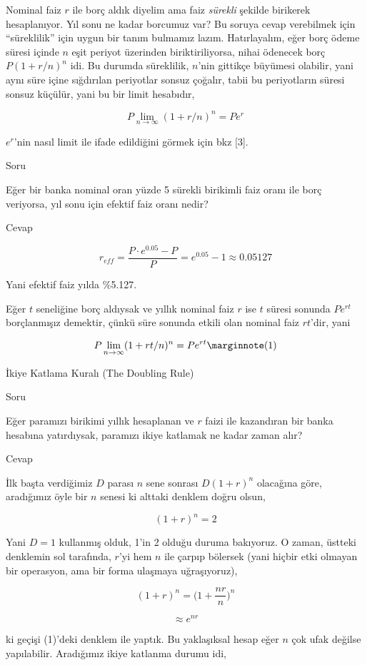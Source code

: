 \documentclass[12pt,fleqn]{article}\usepackage{../../common}
\begin{document}
Nominal faiz $r$ ile borç aldık diyelim ama faiz {\em sürekli} şekilde birikerek
hesaplanıyor. Yıl sonu ne kadar borcumuz var? Bu soruya cevap verebilmek için
``süreklilik'' için uygun bir tanım bulmamız lazım. Hatırlayalım, eğer borç
ödeme süresi içinde $n$ eşit periyot üzerinden biriktiriliyorsa, nihai ödenecek
borç $P(1+r/n)^n$ idi. Bu durumda süreklilik, $n$'nin gittikçe büyümesi
olabilir, yani aynı süre içine sığdırılan periyotlar sonsuz çoğalır, tabii bu
periyotların süresi sonsuz küçülür, yani bu bir limit hesabıdır,

$$ P \lim _{n \to \infty} (1+r/n)^n = Pe^r $$

$e^r$'nin nasıl limit ile ifade edildiğini görmek için bkz [3]. 

Soru

Eğer bir banka nominal oran yüzde 5 sürekli birikimli faiz oranı ile borç
veriyorsa, yıl sonu için efektif faiz oranı nedir?

Cevap

$$ r_{eff} = \frac{P\cdot e^{0.05} - P}{P} = e^{0.05} - 1 \approx 0.05127  $$

Yani efektif faiz yılda \%5.127. 

Eğer $t$ seneliğine borç aldıysak ve yıllık nominal faiz $r$ ise $t$ süresi
sonunda $Pe^{rt}$ borçlanmışız demektir, çünkü süre sonunda etkili olan nominal
faiz $rt$'dir, yani

$$ P \lim _{n \to \infty} (1 + rt / n)^n = Pe^{rt}
\mlabel{1}
$$

İkiye Katlama Kuralı (The Doubling Rule)

Soru

Eğer paramızı birikimi yıllık hesaplanan ve $r$ faizi ile kazandıran bir banka
hesabına yatırdıysak, paramızı ikiye katlamak ne kadar zaman alır?

Cevap

İlk başta verdiğimiz $D$ parası $n$ sene sonrası $D(1+r)^n$ olacağına göre,
aradığımız öyle bir $n$ senesi ki alttaki denklem doğru olsun,

$$ (1+r)^n = 2 $$

Yani $D=1$ kullanmış olduk, 1'in 2 olduğu duruma bakıyoruz. O zaman, üstteki
denklemin sol tarafında, $r$'yi hem $n$ ile çarpıp bölersek (yani hiçbir etki
olmayan bir operasyon, ama bir forma ulaşmaya uğraşıyoruz),

$$ (1+r)^n = \bigg( 1 + \frac{nr}{n} \bigg)^n  $$

$$ \approx e^{nr} $$

ki geçişi (1)'deki denklem ile yaptık. Bu yaklaşıksal hesap eğer $n$ çok ufak
değilse yapılabilir. Aradığımız ikiye katlanma durumu idi,
\end{document}
